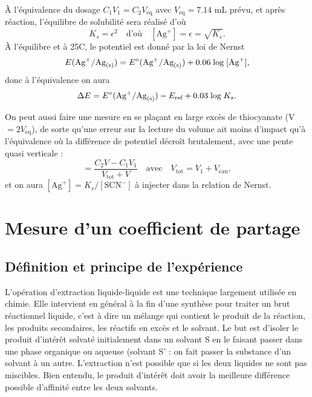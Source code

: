 \documentclass[11pt,a4paper]{report}
\begin{document}
\`A l'équivalence du dosage $C_1 V_1 = C_2 V_\text{eq}$ avec $V_\text{eq} = 7.14$ mL prévu, et après réaction, l'équilibre de solubilité sera réalisé d'où
\begin{equation}
	K_s = \epsilon^2 \quad\text{d'où}\quad [\text{Ag}^+] = \epsilon = \sqrt{K_s}.
\end{equation}
\`A l'équilibre et à 25\degree C, le potentiel est donné par la loi de Nernst
\begin{equation}
	E(\text{Ag}^+/\text{Ag}_\text{(s)}) 
	= E\degree(\text{Ag}^+/\text{Ag}_\text{(s)}) + 0.06\;\text{log}\;[\text{Ag}^+],
\end{equation}
donc à l'équivalence on aura
\begin{equation}
	\Delta E = E\degree(\text{Ag}^+/\text{Ag}_\text{(s)}) - E_\text{ref} + 0.03\;\text{log}\;K_s.
\end{equation}

On peut aussi faire une mesure en se plaçant en large excès de thiocyanate (V $= 2V_\text{eq}$), de sorte qu'une erreur sur la lecture du volume ait moins d'impact qu'à l'équivalence où la différence de potentiel décroît brutalement, avec une pente quasi verticale :
\begin{equation}
	[\text{SCN}^-] = \frac{C_2V-C_1V_1}{V_\text{tot}+ V}\quad\text{avec}\quad V_\text{tot} 
	= V_1 + V_\text{eau},
\end{equation}
et on aura $[\text{Ag}^+] = K_s/[\text{SCN}^-]$ à injecter dans la relation de Nernst.

\newpage
\section{Mesure d'un coefficient de partage}\label{sec:3}

\subsection{Définition et principe de l'expérience}

L'opération d'extraction liquide-liquide est une technique largement utilisée en chimie.
Elle intervient en général à la fin d'une synthèse pour traiter un brut réactionnel liquide,
c'est à dire un mélange qui contient le produit de la réaction, les produits secondaires, les réactifs en excès et le solvant. Le but est d'isoler le produit d'intérêt solvaté initialement dans un solvant S en le faisant passer dans une phase organique ou aqueuse (solvant S' : on fait passer la substance d'un solvant à un autre. L'extraction n'est possible que si les deux liquides ne sont pas miscibles. Bien entendu, le produit d'intérêt doit avoir la meilleure différence possible d'affinité entre les deux solvants.
\end{document}
